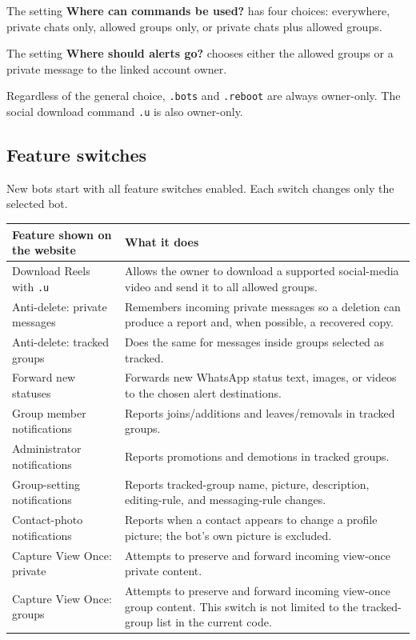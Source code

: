 \documentclass[11pt,a4paper]{article}
\begin{document}
The setting \textbf{Where can commands be used?} has four choices: everywhere, private chats only, allowed groups only, or private chats plus allowed groups.

The setting \textbf{Where should alerts go?} chooses either the allowed groups or a private message to the linked account owner.

Regardless of the general choice, \texttt{.bots} and \texttt{.reboot} are always owner-only. The social download command \texttt{.u} is also owner-only.

\subsection{Feature switches}

New bots start with all feature switches enabled. Each switch changes only the selected bot.

\begin{longtable}{p{}p{}}
\toprule
\textbf{Feature shown on the website} & \textbf{What it does}\\
\midrule
\endhead
Download Reels with \texttt{.u} & Allows the owner to download a supported social-media video and send it to all allowed groups.\\
Anti-delete: private messages & Remembers incoming private messages so a deletion can produce a report and, when possible, a recovered copy.\\
Anti-delete: tracked groups & Does the same for messages inside groups selected as tracked.\\
Forward new statuses & Forwards new WhatsApp status text, images, or videos to the chosen alert destinations.\\
Group member notifications & Reports joins/additions and leaves/removals in tracked groups.\\
Administrator notifications & Reports promotions and demotions in tracked groups.\\
Group-setting notifications & Reports tracked-group name, picture, description, editing-rule, and messaging-rule changes.\\
Contact-photo notifications & Reports when a contact appears to change a profile picture; the bot's own picture is excluded.\\
Capture View Once: private & Attempts to preserve and forward incoming view-once private content.\\
Capture View Once: groups & Attempts to preserve and forward incoming view-once group content. This switch is not limited to the tracked-group list in the current code.\\
\bottomrule
\end{longtable}
\end{document}
